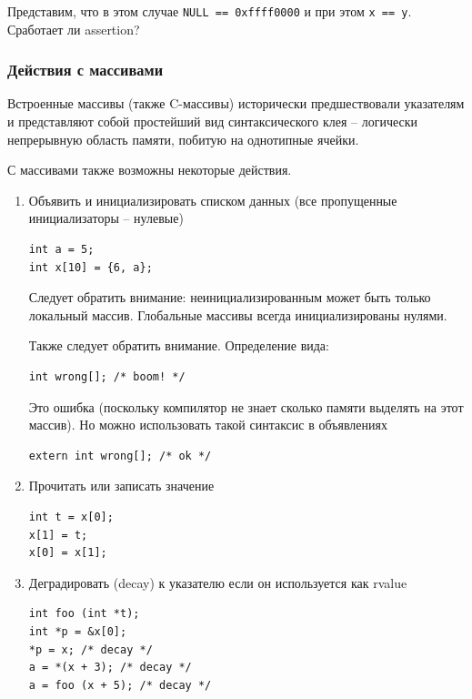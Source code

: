 \documentclass[a4paper,12pt,oneside]{article}
\newif\ifanswers
\begin{document}
Представим, что в этом случае \lstinline!NULL == 0xffff0000! и при этом \lstinline!x == y!. Сработает ли assertion?

\ifanswers
Правильный ответ: увы, нет. Стандарт гарантирует стабильное обращение с нулями времени компиляции, но не нулями времени исполнения (C99 6.3.2.3), иначе проверками пришлось бы завешивать слишком много кода.
\fi

\subsubsection{Действия с массивами}

Встроенные массивы (также C-массивы) исторически предшествовали указателям и представляют собой простейший вид синтаксического клея -- логически непрерывную область памяти, побитую на однотипные ячейки.

С массивами также возможны некоторые действия.

\begin{enumerate}
\item Объявить и инициализировать списком данных (все пропущенные инициализаторы -- нулевые)
\begin{lstlisting}
int a = 5;
int x[10] = {6, a};
\end{lstlisting}

Следует обратить внимание: неинициализированным может быть только локальный массив. Глобальные массивы всегда инициализированы нулями.

Также следует обратить внимание. Определение вида:
\begin{lstlisting}
int wrong[]; /* boom! */
\end{lstlisting}
Это ошибка (поскольку компилятор не знает сколько памяти выделять на этот массив). Но можно использовать такой синтаксис в объявлениях
\begin{lstlisting}
extern int wrong[]; /* ok */
\end{lstlisting}
\item Прочитать или записать значение
\begin{lstlisting}
int t = x[0];
x[1] = t;
x[0] = x[1];
\end{lstlisting}
\item Деградировать (decay) к указателю если он используется как rvalue\label{ArrDecaying}
\begin{lstlisting}
int foo (int *t);
int *p = &x[0];
*p = x; /* decay */
a = *(x + 3); /* decay */
a = foo (x + 5); /* decay */
\end{lstlisting}
\end{enumerate}
\end{document}
